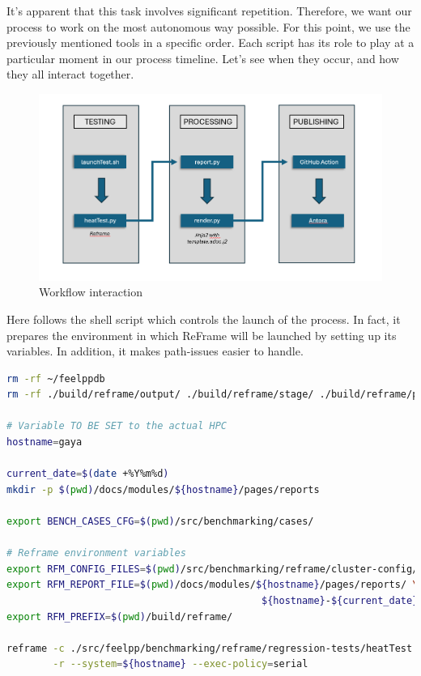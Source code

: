 \documentclass[12pt]{article}
\begin{document}
It's apparent that this task involves significant repetition. Therefore, we want our process to work on the most autonomous way possible.
For this point, we use the previously mentioned tools in a specific order. Each script has its role to play at a particular moment in our process timeline.
Let's see when they occur, and how they all interact together.

\begin{figure}[H]
    \centering
    \includegraphics[width=\textwidth]{../illustrations/processWithFiles.png}
    \caption{Workflow interaction}
\end{figure}

Here follows the shell script which controls the launch of the process. In fact, it prepares the environment in which ReFrame will be launched by setting up its variables.
In addition, it makes path-issues easier to handle.\\

\begin{lstlisting}[language=bash,caption={Script for process launching}]
rm -rf ~/feelppdb
rm -rf ./build/reframe/output/ ./build/reframe/stage/ ./build/reframe/perflogs

# Variable TO BE SET to the actual HPC
hostname=gaya

current_date=$(date +%Y%m%d)
mkdir -p $(pwd)/docs/modules/${hostname}/pages/reports

export BENCH_CASES_CFG=$(pwd)/src/benchmarking/cases/

# Reframe environment variables
export RFM_CONFIG_FILES=$(pwd)/src/benchmarking/reframe/cluster-config/${hostname}.py
export RFM_REPORT_FILE=$(pwd)/docs/modules/${hostname}/pages/reports/ \
                                            ${hostname}-${current_date}-{sessionid}.json
export RFM_PREFIX=$(pwd)/build/reframe/

reframe -c ./src/feelpp/benchmarking/reframe/regression-tests/heatTest.py \
        -r --system=${hostname} --exec-policy=serial
\end{lstlisting}
\end{document}
